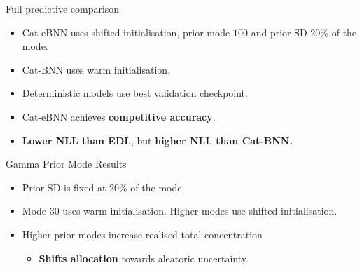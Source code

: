 \begin{frame}{Full predictive comparison}
\label{frm:backup-predictive}
\begin{itemize}
\item Cat-eBNN uses shifted initialisation, prior mode $100$ and prior SD $20\%$ of the mode.
\item Cat-BNN uses warm initialisation. 
\item Deterministic models use best validation checkpoint.
\item Cat-eBNN achieves \textbf{competitive accuracy}.
\item \textbf{Lower NLL than EDL}, but \textbf{higher NLL than Cat-BNN.}
\end{itemize}
\end{frame}

\begin{frame}{Gamma Prior Mode Results}
\label{frm:appendix-prior-mode-results}
\begin{itemize}
\item Prior SD is fixed at $20\%$ of the mode.
\item Mode $30$ uses warm initialisation. Higher modes use shifted initialisation.
\item Higher prior modes increase realised total concentration 
\begin{itemize}
\item \textbf{Shifts allocation} towards aleatoric uncertainty.
\end{itemize}
\end{itemize}
\end{frame}

